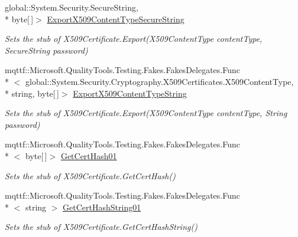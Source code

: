 \begin{DoxyCompactItemize}
global\-::\-System.\-Security.\-Secure\-String, \\*
byte\mbox{[}$\,$\mbox{]}$>$ \hyperlink{class_system_1_1_security_1_1_cryptography_1_1_x509_certificates_1_1_fakes_1_1_stub_x509_certificate2_add70f54891d548c3e1116a77a47fc9f4}{Export\-X509\-Content\-Type\-Secure\-String}
\begin{DoxyCompactList}\small\item\em Sets the stub of X509\-Certificate.\-Export(\-X509\-Content\-Type content\-Type, Secure\-String password)\end{DoxyCompactList}\item 
mqttf\-::\-Microsoft.\-Quality\-Tools.\-Testing.\-Fakes.\-Fakes\-Delegates.\-Func\\*
$<$ global\-::\-System.\-Security.\-Cryptography.\-X509\-Certificates.\-X509\-Content\-Type, \\*
string, byte\mbox{[}$\,$\mbox{]}$>$ \hyperlink{class_system_1_1_security_1_1_cryptography_1_1_x509_certificates_1_1_fakes_1_1_stub_x509_certificate2_ac0da1258789c516c73ace248ea2f63eb}{Export\-X509\-Content\-Type\-String}
\begin{DoxyCompactList}\small\item\em Sets the stub of X509\-Certificate.\-Export(\-X509\-Content\-Type content\-Type, String password)\end{DoxyCompactList}\item 
mqttf\-::\-Microsoft.\-Quality\-Tools.\-Testing.\-Fakes.\-Fakes\-Delegates.\-Func\\*
$<$ byte\mbox{[}$\,$\mbox{]}$>$ \hyperlink{class_system_1_1_security_1_1_cryptography_1_1_x509_certificates_1_1_fakes_1_1_stub_x509_certificate2_aa687aefaefb7c213a6ed1a20f940f44b}{Get\-Cert\-Hash01}
\begin{DoxyCompactList}\small\item\em Sets the stub of X509\-Certificate.\-Get\-Cert\-Hash()\end{DoxyCompactList}\item 
mqttf\-::\-Microsoft.\-Quality\-Tools.\-Testing.\-Fakes.\-Fakes\-Delegates.\-Func\\*
$<$ string $>$ \hyperlink{class_system_1_1_security_1_1_cryptography_1_1_x509_certificates_1_1_fakes_1_1_stub_x509_certificate2_a268fdfad2699908adab57c33e9bd5940}{Get\-Cert\-Hash\-String01}
\begin{DoxyCompactList}\small\item\em Sets the stub of X509\-Certificate.\-Get\-Cert\-Hash\-String()\end{DoxyCompactList}\item 

\end{DoxyCompactItemize}
